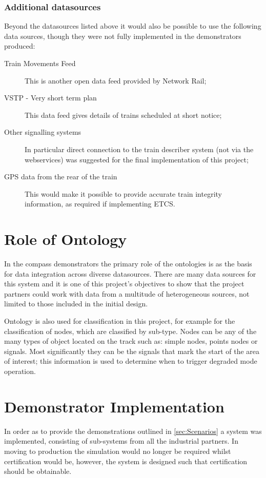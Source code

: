     \subsubsection{Additional datasources}
Beyond the datasources listed above it would also be possible to use the following data sources, though they were not fully implemented in the demonstrators produced:
\begin{description}
    \item [Train Movements Feed] This is another open data feed provided by Network Rail;
    \item [VSTP - Very short term plan] This data feed gives details of trains scheduled at short notice;
    \item [Other signalling systems] In particular direct connection to the train describer system (not via the webservices) was suggested for the final implementation of this project;
    \item [GPS data from the rear of the train] This would make it possible to provide accurate train integrity information, as required if implementing ETCS.     
\end{description}

 \section{Role of Ontology}

In the compass demonstrators the primary role of the ontologies is as the basis for data integration across diverse datasources. There are many data sources for this system and it is one of this project's objectives to show that the project partners could work with data from a multitude of heterogeneous sources, not limited to those included in the initial design. 

Ontology is also used for classification in this project, for example for the classification of nodes, which are classified by sub-type. Nodes can be any of the many types of object located on the track such as: simple nodes, points nodes or signals. Most significantly they can be the signals that mark the start of the area of interest; this information is used to determine when to trigger degraded mode operation.

\section{Demonstrator Implementation}
In order as to provide the demonstrations outlined in \autoref{sec:Scenarios} a system was implemented, consisting of sub-systems from all the industrial partners. In moving to production the simulation would no longer be required whilst certification would be, however, the system is designed such that certification should be obtainable. 

